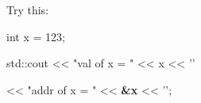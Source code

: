 Try this:

\begin{consolethree}[escapeinside=||]

int x = 123;

std::cout << "val of x = " << x << '\n'

<< "addr of x = " << \textbf{\&x} << '\n';
\end{consolethree}













